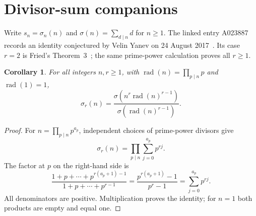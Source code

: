 \documentclass[11pt]{article}
\newtheorem{corollary}[theorem]{Corollary}
\begin{document}
\section{Divisor-sum companions}

Write $s_n=\sigma_n(n)$ and $\sigma(n)=\sum_{d\mid n}d$ for $n\geq1$.
The linked entry A023887 records an identity conjectured by Velin Yanev
on 24 August 2017~\cite{divisors}. Its case $r=2$ is Fried's
Theorem~3~\cite{fried}; the same prime-power calculation proves all $r\geq1$.

\begin{corollary}\label{cor:radical}
For all integers $n,r\geq1$, with
$\operatorname{rad}(n)=\prod_{p\mid n}p$ and $\operatorname{rad}(1)=1$,
\[
 \sigma_r(n)=
 \frac{\sigma(n^r\operatorname{rad}(n)^{r-1})}
      {\sigma(\operatorname{rad}(n)^{r-1})}.
\]
\end{corollary}
\begin{proof}
For $n=\prod_{p\mid n}p^{a_p}$, independent choices of prime-power
divisors give
\[
 \sigma_r(n)=\prod_{p\mid n}\sum_{j=0}^{a_p}p^{rj}.
\]
The factor at $p$ on the right-hand side is
\[
 \frac{1+p+\cdots+p^{r(a_p+1)-1}}
      {1+p+\cdots+p^{r-1}}
   =\frac{p^{r(a_p+1)}-1}{p^r-1}
   =\sum_{j=0}^{a_p}p^{rj}.
\]
All denominators are positive. Multiplication proves the identity;
for $n=1$ both products are empty and equal one.
\end{proof}
\end{document}
